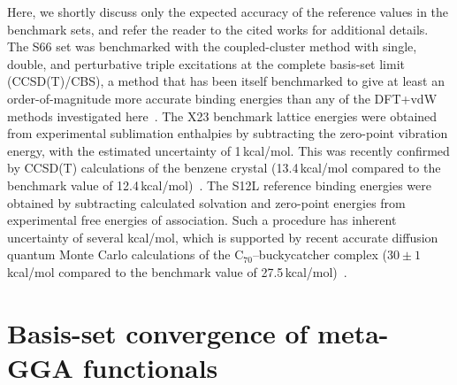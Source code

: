 Here, we shortly discuss only the expected accuracy of the reference values in the benchmark sets, and refer the reader to the cited works for additional details.
The S66 set was benchmarked with the coupled-cluster method with single, double, and perturbative triple excitations at the complete basis-set limit (CCSD(T)/CBS), a method that has been itself benchmarked to give at least an order-of-magnitude more accurate binding energies than any of the DFT+vdW methods investigated here~\cite{RezacJCTC13}. %
The X23 benchmark lattice energies were obtained from experimental sublimation enthalpies by subtracting the zero-point vibration energy, with the estimated uncertainty of 1\,kcal/mol.
This was recently confirmed by CCSD(T) calculations of the benzene crystal (13.4\,kcal/mol compared to the benchmark value of 12.4\,kcal/mol)~\cite{YangS14}. %
The S12L reference binding energies were obtained by subtracting calculated solvation and zero-point energies from experimental free energies of association.
Such a procedure has inherent uncertainty of several kcal/mol, which is supported by recent accurate diffusion quantum Monte Carlo calculations of the C$_{70}$--buckycatcher complex ($30\pm1$\,kcal/mol compared to the benchmark value of 27.5\,kcal/mol)~\cite{ZenPRB16}.

\section{Basis-set convergence of meta-GGA functionals}


